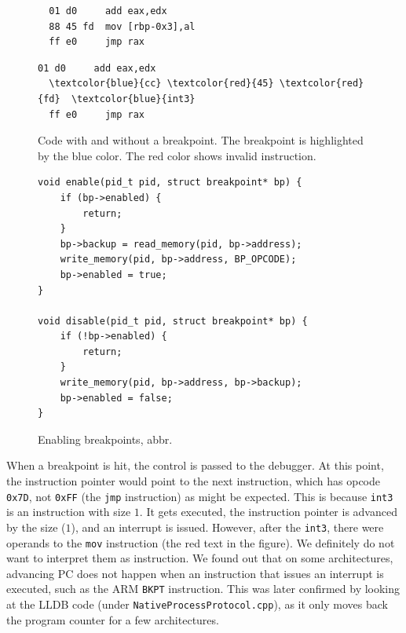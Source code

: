 \begin{figure}
    \begin{minipage}{0.45\textwidth}
        \begin{Verbatim}
  01 d0     add eax,edx
  88 45 fd  mov [rbp-0x3],al
  ff e0     jmp rax
        \end{Verbatim}
    \end{minipage}
    \hfill\vline\hfill
    \begin{minipage}{0.45\textwidth}
        \begin{Verbatim}[commandchars=\\\{\}]
  01 d0     add eax,edx
  \textcolor{blue}{cc} \textcolor{red}{45} \textcolor{red}{fd}  \textcolor{blue}{int3}
  ff e0     jmp rax
        \end{Verbatim}
    \end{minipage}
    \caption{Code with and without a breakpoint. The breakpoint is highlighted
    by the blue color. The red color shows invalid instruction.} 
    \label{fig:with-and-without-bp}
\end{figure}

\begin{figure}
    \begin{verbatim}
void enable(pid_t pid, struct breakpoint* bp) {
    if (bp->enabled) {
        return;
    }
    bp->backup = read_memory(pid, bp->address);
    write_memory(pid, bp->address, BP_OPCODE);
    bp->enabled = true;
}

void disable(pid_t pid, struct breakpoint* bp) {
    if (!bp->enabled) {
        return;
    }
    write_memory(pid, bp->address, bp->backup);
    bp->enabled = false;
}
    \end{verbatim}
    \caption{Enabling breakpoints, abbr.}
    \label{fig:breakpoint-enable}
\end{figure}

When a breakpoint is hit, the control is passed to the debugger. At this point,
the instruction pointer would point to the next instruction, which has opcode
\texttt{0x7D}, not \texttt{0xFF} (the \texttt{jmp} instruction) as might be
expected. This is because \texttt{int3} is an instruction with size $1$. It
gets executed, the instruction pointer is advanced by the size ($1$), and an
interrupt is issued. However, after the \texttt{int3}, there were operands to
the \texttt{mov} instruction (the red text in the figure). We definitely do not
want to interpret them as instruction. We found out that on some architectures,
advancing PC does not happen when an instruction that issues an interrupt is
executed, such as the ARM \texttt{BKPT} instruction. This was later confirmed
by looking at the LLDB code (under \verb|NativeProcessProtocol.cpp|), as it
only moves back the program counter for a few architectures.


